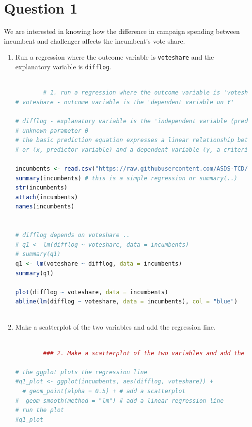 \documentclass[12pt,letterpaper]{article}
\begin{document}
\section*{Question 1} %
\vspace{.25cm}
\noindent We are interested in knowing how the difference in campaign spending between incumbent and challenger affects the incumbent's vote share. 
	\begin{enumerate}
		\item Run a regression where the outcome variable is \texttt{voteshare} and the explanatory variable is \texttt{difflog}.	\vspace{5cm}
		
		
		\begin{lstlisting}[language=R]
		
		# 1. run a regression where the outcome variable is 'voteshare' and the explanatory variable is 'difflog'
# voteshare - outcome variable is the 'dependent variable on Y'

# difflog - explanatory variable is the 'independent variable (predictor variable) on X' 
# unknown parameter θ
# the basic prediction equation expresses a linear relationship between an independent variable 
# or (x, predictor variable) and a dependent variable (y, a criterian variable)

incumbents <- read.csv("https://raw.githubusercontent.com/ASDS-TCD/StatsI_Fall2021/main/datasets/incumbents_subset.csv")
summary(incumbents) # this is a simple regression or summary(..)
str(incumbents)
attach(incumbents)
names(incumbents)


# difflog depends on voteshare ..
# q1 <- lm(difflog ~ voteshare, data = incumbents)
# summary(q1)
q1 <- lm(voteshare ~ difflog, data = incumbents)
summary(q1)

plot(difflog ~ voteshare, data = incumbents)
abline(lm(difflog ~ voteshare, data = incumbents), col = "blue")
		
		\end{lstlisting}
		
		\item Make a scatterplot of the two variables and add the regression line. 	\vspace{7cm}
		
		\begin{lstlisting}[language=R]
		
		### 2. Make a scatterplot of the two variables and add the regression line ####

# the ggplot plots the regression line
#q1_plot <- ggplot(incumbents, aes(difflog, voteshare)) +
  # geom_point(alpha = 0.5) + # add a scatterplot
#  geom_smooth(method = "lm") # add a linear regression line
# run the plot
#q1_plot


\end{lstlisting}
\end{enumerate}
\end{document}
